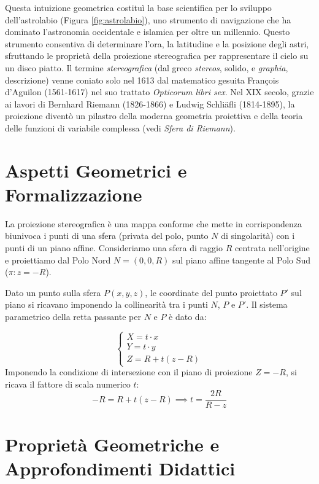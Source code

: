 \documentclass[11pt]{article}
\begin{document}
Questa intuizione geometrica costituì la base scientifica per lo sviluppo dell'astrolabio (Figura \ref{fig:astrolabio}), uno strumento di navigazione che ha dominato l'astronomia occidentale e islamica per oltre un millennio. Questo strumento consentiva di determinare l'ora, la latitudine e la posizione degli astri, sfruttando le proprietà della proiezione stereografica per rappresentare il cielo su un disco piatto. Il termine \textit{stereografica} (dal greco \textit{stereos}, solido, e \textit{graphia}, descrizione) venne coniato solo nel 1613 dal matematico gesuita François d'Aguilon (1561-1617) nel suo trattato \textit{Opticorum libri sex}. Nel XIX secolo, grazie ai lavori di Bernhard Riemann (1826-1866) e Ludwig Schli\"{a}fli (1814-1895), la proiezione diventò un pilastro della moderna geometria proiettiva e della teoria delle funzioni di variabile complessa (vedi \textit{Sfera di Riemann}).

\section{Aspetti Geometrici e Formalizzazione}
La proiezione stereografica è una mappa conforme che mette in corrispondenza biunivoca i punti di una sfera (privata del polo, punto $N$ di singolarità) con i punti di un piano affine. Consideriamo una sfera di raggio $R$ centrata nell'origine e proiettiamo dal Polo Nord $N=(0,0,R)$ sul piano affine tangente al Polo Sud ($\pi: z=-R$).

Dato un punto sulla sfera $P(x,y,z)$, le coordinate del punto proiettato $P'$ sul piano si ricavano imponendo la collinearità tra i punti $N$, $P$ e $P'$. Il sistema parametrico della retta passante per $N$ e $P$ è dato da:

\begin{equation}
\begin{cases}
X = t \cdot x \\
Y = t \cdot y \\
Z = R + t(z - R)
\end{cases}
\end{equation}
Imponendo la condizione di intersezione con il piano di proiezione $Z = -R$, si ricava il fattore di scala numerico $t$:
\begin{equation}
-R = R + t(z - R) \implies t = \frac{2R}{R - z}
\end{equation}

\section{Proprietà Geometriche e Approfondimenti Didattici}
\end{document}

